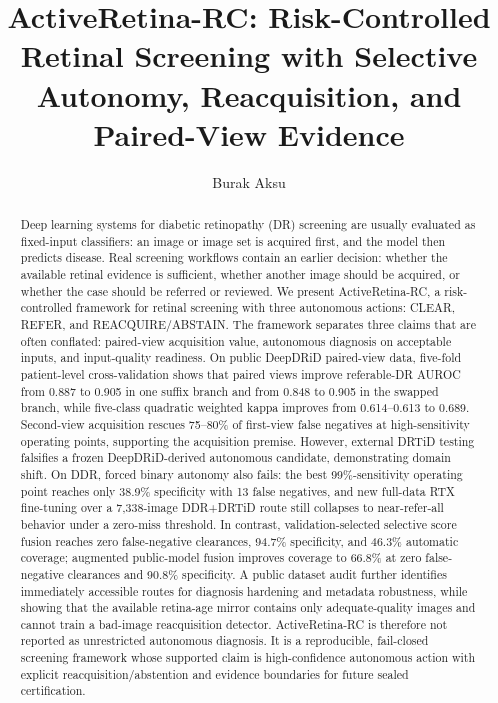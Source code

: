\documentclass[journal]{IEEEtran}
\title{ActiveRetina-RC: Risk-Controlled Retinal Screening with Selective Autonomy, Reacquisition, and Paired-View Evidence}
\author{Burak Aksu}
\begin{document}
\maketitle

\begin{abstract}
Deep learning systems for diabetic retinopathy (DR) screening are usually evaluated as fixed-input classifiers: an image or image set is acquired first, and the model then predicts disease. Real screening workflows contain an earlier decision: whether the available retinal evidence is sufficient, whether another image should be acquired, or whether the case should be referred or reviewed. We present ActiveRetina-RC, a risk-controlled framework for retinal screening with three autonomous actions: CLEAR, REFER, and REACQUIRE/ABSTAIN. The framework separates three claims that are often conflated: paired-view acquisition value, autonomous diagnosis on acceptable inputs, and input-quality readiness. On public DeepDRiD paired-view data, five-fold patient-level cross-validation shows that paired views improve referable-DR AUROC from 0.887 to 0.905 in one suffix branch and from 0.848 to 0.905 in the swapped branch, while five-class quadratic weighted kappa improves from 0.614--0.613 to 0.689. Second-view acquisition rescues 75--80\% of first-view false negatives at high-sensitivity operating points, supporting the acquisition premise. However, external DRTiD testing falsifies a frozen DeepDRiD-derived autonomous candidate, demonstrating domain shift. On DDR, forced binary autonomy also fails: the best 99\%-sensitivity operating point reaches only 38.9\% specificity with 13 false negatives, and new full-data RTX fine-tuning over a 7,338-image DDR+DRTiD route still collapses to near-refer-all behavior under a zero-miss threshold. In contrast, validation-selected selective score fusion reaches zero false-negative clearances, 94.7\% specificity, and 46.3\% automatic coverage; augmented public-model fusion improves coverage to 66.8\% at zero false-negative clearances and 90.8\% specificity. A public dataset audit further identifies immediately accessible routes for diagnosis hardening and metadata robustness, while showing that the available retina-age mirror contains only adequate-quality images and cannot train a bad-image reacquisition detector. ActiveRetina-RC is therefore not reported as unrestricted autonomous diagnosis. It is a reproducible, fail-closed screening framework whose supported claim is high-confidence autonomous action with explicit reacquisition/abstention and evidence boundaries for future sealed certification.
\end{abstract}
\end{document}
